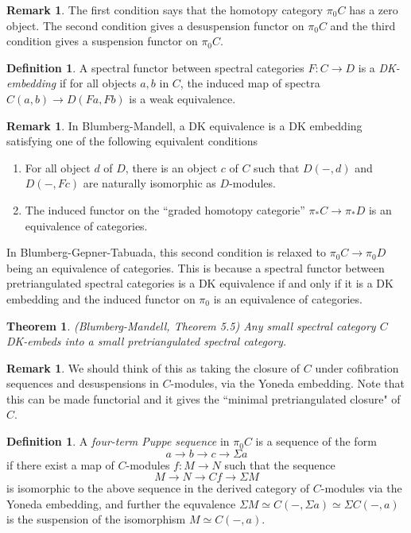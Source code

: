\documentclass[letterpaper]{article}
\newtheorem{theorem}{Theorem}
\theoremstyle{definition}
\newtheorem{definition}[lemma]{Definition}
\newtheorem{remark}[lemma]{Remark}
\begin{document}
\begin{remark}
The first condition says that the homotopy category $\pi_0 C$ has a zero object. The second condition gives a desuspension functor on $\pi_0 C$ and the third condition gives a suspension functor on $\pi_0 C$. 
\end{remark}

\begin{definition}
A spectral functor between spectral categories $F : C \rightarrow D$ is a \textit{DK-embedding} if for all objects $a,b$ in $C$, the induced map of spectra
$C(a,b) \rightarrow D(Fa,Fb)$ is a weak equivalence. 
\end{definition}

\begin{remark}
In Blumberg-Mandell, a DK equivalence is a DK embedding satisfying one of the following equivalent conditions 
\begin{enumerate}
\item For all object $d$ of $D$, there is an object $c$ of $C$ such that $D(-,d)$ and $D(-,Fc)$ are naturally isomorphic as $D$-modules.
\item The induced functor on the ``graded homotopy categorie'' $\pi_* C \rightarrow \pi_* D$ is an equivalence of categories. 
\end{enumerate}
In Blumberg-Gepner-Tabuada, this second condition is relaxed to $\pi_0 C \rightarrow \pi_0 D$ being an equivalence of categories. This is because a spectral functor between pretriangulated spectral categories is a DK equivalence if and only if it is a DK embedding and the induced functor on $\pi_0$ is an equivalence of categories. 
\end{remark}

\begin{theorem}(Blumberg-Mandell, Theorem 5.5)
Any small spectral category $C$ DK-embeds into a small pretriangulated spectral category. 
\end{theorem}

\begin{remark}
We should think of this as taking the closure of $C$ under cofibration sequences and desuspensions in $C$-modules, via the Yoneda embedding. Note that this can be made functorial and it gives the ``minimal pretriangulated closure" of $C$. 
\end{remark}

\begin{definition}
A \textit{four-term Puppe sequence} in $\pi_0 C$ is a sequence of the form
$$a \rightarrow b \rightarrow c \rightarrow \Sigma a$$
if there exist a map of $C$-modules $f : M \rightarrow N$ such that the sequence
$$M \rightarrow N \rightarrow Cf \rightarrow \Sigma M$$
is isomorphic to the above sequence in the derived category of $C$-modules via the Yoneda embedding, and further the equvalence $\Sigma M \simeq C(-,\Sigma a) \simeq \Sigma C(-,a)$ is the suspension of the isomorphism $M \simeq C(-,a)$. 
\end{definition}
\end{document}

